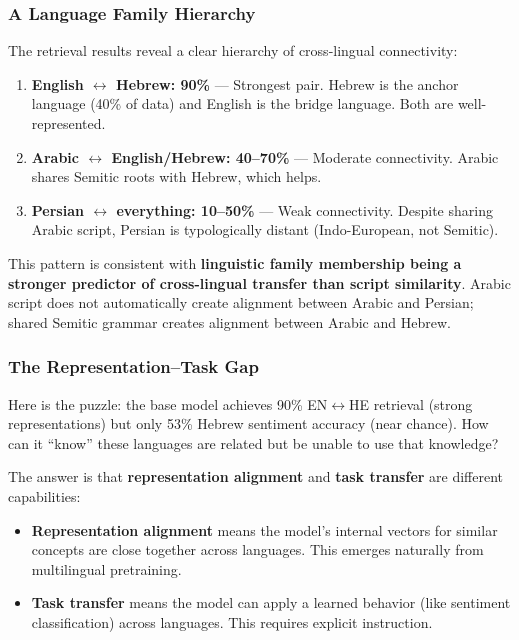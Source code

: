 \documentclass[11pt,a4paper]{article}
\begin{document}
\subsubsection{A Language Family Hierarchy}

The retrieval results reveal a clear hierarchy of cross-lingual connectivity:

\begin{enumerate}
    \item \textbf{English $\leftrightarrow$ Hebrew: 90\%} --- Strongest pair. Hebrew is the anchor language (40\% of data) and English is the bridge language. Both are well-represented.
    \item \textbf{Arabic $\leftrightarrow$ English/Hebrew: 40--70\%} --- Moderate connectivity. Arabic shares Semitic roots with Hebrew, which helps.
    \item \textbf{Persian $\leftrightarrow$ everything: 10--50\%} --- Weak connectivity. Despite sharing Arabic script, Persian is typologically distant (Indo-European, not Semitic).
\end{enumerate}

This pattern is consistent with \textbf{linguistic family membership being a stronger predictor of cross-lingual transfer than script similarity}. Arabic script does not automatically create alignment between Arabic and Persian; shared Semitic grammar creates alignment between Arabic and Hebrew.

\subsubsection{The Representation--Task Gap}

Here is the puzzle: the base model achieves 90\% EN$\leftrightarrow$HE retrieval (strong representations) but only 53\% Hebrew sentiment accuracy (near chance). How can it ``know'' these languages are related but be unable to use that knowledge?

The answer is that \textbf{representation alignment} and \textbf{task transfer} are different capabilities:

\begin{itemize}
    \item \textbf{Representation alignment} means the model's internal vectors for similar concepts are close together across languages. This emerges naturally from multilingual pretraining.
    \item \textbf{Task transfer} means the model can apply a learned behavior (like sentiment classification) across languages. This requires explicit instruction.
\end{itemize}
\end{document}
